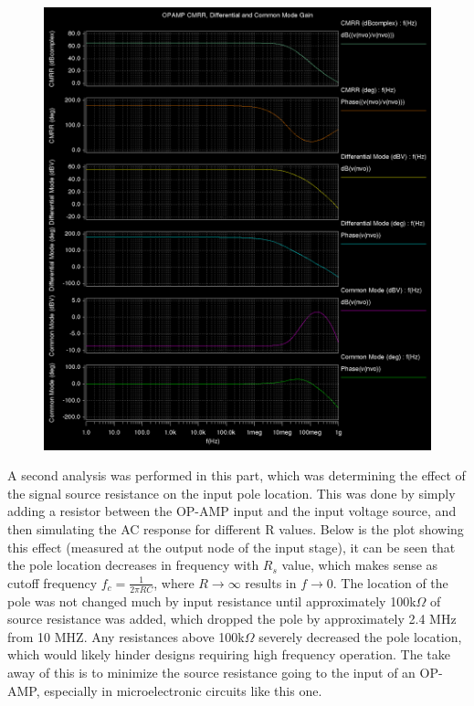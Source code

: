 \documentclass[12pt]{article}
\begin{document}
\FloatBarrier
\begin{figure}[h!]
\begin{center}
 \includegraphics[scale=0.3]{./cmrrfull.png}
\end{center}
\end{figure}
\FloatBarrier
A second analysis was performed in this part, which was determining the effect of the signal source resistance on the input pole location. This was done by simply adding a resistor between the OP-AMP input and the input voltage source, and then simulating the AC response for different R values. Below is the plot showing this effect (measured at the output node of the input stage), it can be seen that the pole location decreases in frequency with $R_s$ value, which makes sense as cutoff frequency $f_c = \frac{1}{2\pi RC}$, where $R\rightarrow\infty$ results in $f\rightarrow 0$. The location of the pole was not changed much by input resistance until approximately 100k$\Omega$ of source resistance was added, which dropped the pole by approximately 2.4 MHz from 10 MHZ. Any resistances above 100k$\Omega$ severely decreased the pole location, which would likely hinder designs requiring high frequency operation. The take away of this is to minimize the source resistance going to the input of an OP-AMP, especially in microelectronic circuits like this one.
\end{document}
